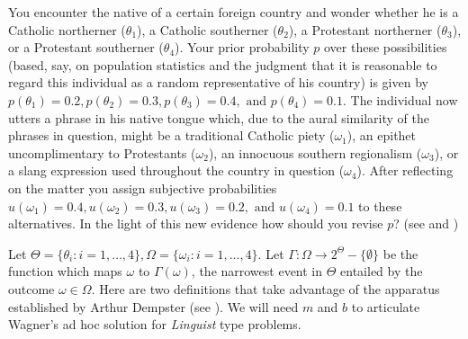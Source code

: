\documentclass[11pt]{article}
\begin{document}



\begin{quotex}
  You encounter the native of a certain foreign country and wonder
  whether he is a Catholic northerner ($\theta_{1}$), a Catholic
  southerner ($\theta_{2}$), a Protestant northerner ($\theta_{3}$),
  or a Protestant southerner ($\theta_{4}$). Your prior probability
  $p$ over these possibilities (based, say, on population statistics
  and the judgment that it is reasonable to regard this individual as
  a random representative of his country) is given by
  $p(\theta_{1})=0.2,p(\theta_{2})=0.3,p(\theta_{3})=0.4,\mbox{ and
  }p(\theta_{4})=0.1$. The individual now utters a phrase in his
  native tongue which, due to the aural similarity of the phrases in
  question, might be a traditional Catholic piety ($\omega_{1}$), an
  epithet uncomplimentary to Protestants ($\omega_{2}$), an innocuous
  southern regionalism ($\omega_{3}$), or a slang expression used
  throughout the country in question ($\omega_{4}$). After reflecting
  on the matter you assign subjective probabilities
  $u(\omega_{1})=0.4,u(\omega_{2})=0.3,u(\omega_{3})=0.2,\mbox{ and
  }u(\omega_{4})=0.1$ to these alternatives. In the light of this new
  evidence how should you revise $p$? (see 
  and )
\end{quotex}

Let $\Theta=\{\theta_{i}:i=1,\ldots,4\},\Omega=\{\omega_{i}:i=1,\ldots,4\}$.
Let $\Gamma:\Omega\rightarrow{}2^{\Theta}-\{\emptyset\}$ be the function
which maps $\omega$ to $\Gamma(\omega)$, the narrowest event in
$\Theta$ entailed by the outcome $\omega\in\Omega$. Here are two
definitions that take advantage of the apparatus established by Arthur
Dempster (see ). We will need $m$ and $b$ to
articulate Wagner's ad hoc solution for \emph{Linguist} type problems.
\end{document}
